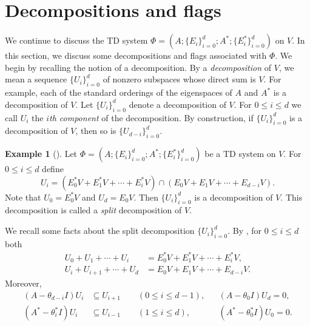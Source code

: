 \documentclass[11pt]{article}%
\theoremstyle{definition}
\newtheorem{example}[definition]{Example}
\theoremstyle{plain}
\begin{document}
\section{Decompositions and flags}\label{Sec:DecompFlag}

We continue to discuss the TD system $\Phi=( A; \{ E_i \}_{i=0}^d; A^*; \{ E_i^* \}_{i=0}^{d} )$ on $V$.
In this section, we discuss some decompositions and flags associated with $\Phi$.
We begin by recalling the notion of a decomposition.
By a \emph{decomposition} of $V$, we mean a sequence $\{U_i\}_{i=0}^d$ of nonzero subspaces whose direct sum is $V$.
For example, each of the standard orderings of the eigenspaces of $A$ and $A^*$ is a decomposition of $V$.
Let $\{U_i\}_{i=0}^d$ denote a decomposition of $V$.
For $0 \leq i \leq d$ we call $U_i$ the \emph{$i$th component} of the decomposition.
By construction, if $\{U_i\}_{i=0}^d$ is a decomposition of $V$, then so is $\{U_{d-i}\}_{i=0}^d$.

\begin{example}[{\cite[Section~4]{ITT2001}}]
Let $\Phi=( A; \{ E_i \}_{i=0}^d; A^*; \{ E_i^* \}_{i=0}^{d} )$ be a TD system on $V$.
For $0 \leq i \leq d$ define
\begin{equation}\label{eq:split U_i}
	U_i = (E_0^*V + E_1^*V + \cdots + E_i^*V) \cap (E_0V + E_1V + \cdots + E_{d-i}V).
\end{equation}
Note that $U_0 = E_0^*V$ and $U_d = E_0V$.
Then $\{U_i\}_{i=0}^d$ is a decomposition of $V$.
This decomposition is called a \emph{split} decomposition of $V$.
\end{example}

\noindent
We recall some facts about the split decomposition $\{U_i\}_{i=0}^d$.
By \cite[Theorem~4.6]{ITT2001}, for $0 \leq i \leq d$ both
\begin{align*}
	U_0 + U_1 + \cdots + U_i & = E_0^*V + E_1^*V + \cdots + E_i^*V, \\
	U_i + U_{i+1} + \cdots + U_d & = E_0V + E_{1}V + \cdots + E_{d-i}V.
\end{align*}
Moreover, 
\begin{align*}
	&& (A - \theta_{d-i} I )U_i & \subseteq U_{i+1} \qquad (0 \leq i \leq d-1), && (A - \theta_0I)U_d = 0, && \\
	&& (A^* - \theta_i^* I )U_i & \subseteq U_{i-1} \qquad (1 \leq i \leq d), && (A^* - \theta_0^*I)U_0 = 0. &&
\end{align*}
\end{document}
